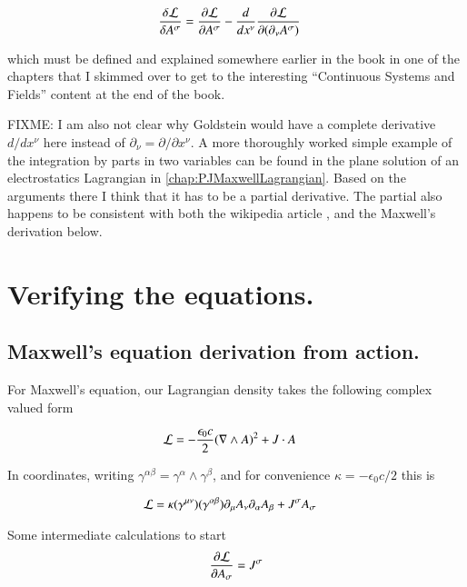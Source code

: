 \begin{align*}
\frac{\delta \mathcal{L}}{\delta A^\sigma} &= \frac{\partial {\mathcal{L}}}{\partial {A^\sigma}} - \frac{d}{dx^\nu} \frac{\partial {\mathcal{L}}}{\partial {(\partial_\nu A^\sigma)}}
\end{align*}

which must be defined and explained somewhere earlier in the book in one of the chapters that I skimmed over to get to the interesting ``Continuous Systems and Fields'' content
at the end of the book.

FIXME: I am also not clear why Goldstein would have a complete derivative $d/dx^\nu$ here instead of $\partial_\nu = \partial/{\partial x^\nu}$.  A more thoroughly worked simple example
of the integration by parts in two variables can be found in the plane solution of an electrostatics Lagrangian in \ref{chap:PJMaxwellLagrangian}.  Based on the arguments there I think that it has to be a partial derivative.   The partial also happens to be consistent with both the wikipedia article \cite{wiki:emtensor}, and the Maxwell's derivation below.

\section{Verifying the equations. }
\subsection{Maxwell's equation derivation from action. }

For Maxwell's equation, our Lagrangian density takes the following complex valued form

\begin{align}\label{eqn:fieldLag:maxlag}
\mathcal{L} &= -\frac{\epsilon_0 c}{2} (\nabla \wedge A)^2 + J \cdot A
\end{align}

In coordinates, writing $\gamma^{\alpha\beta} = \gamma^\alpha \wedge \gamma^\beta$, and 
for convenience $\kappa = -\epsilon_0 c /2$ this is

\begin{align}\label{eqn:fieldLag:maxlagcomp}
\mathcal{L} &= \kappa (\gamma^{\mu\nu}) (\gamma^{\alpha\beta}) \partial_\mu A_\nu \partial_\alpha A_\beta + J^\sigma A_\sigma
\end{align}

Some intermediate calculations to start
\begin{align*}
\frac{\partial {\mathcal{L}}}{\partial {A_\sigma}} = J^\sigma
\end{align*}

